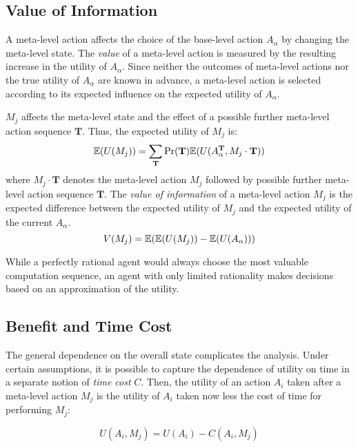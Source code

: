 \subsection{Value of Information}
\label{sec:ratimeta-voi}

A meta-level action affects the choice of the base-level action
$A_\alpha$ by changing the meta-level state.
The {\em value} of a meta-level action is measured by the
resulting increase in the utility of $A_\alpha$. Since neither the
outcomes of meta-level actions nor the true utility of $A_\alpha$ are
known in advance, a meta-level action is selected according to its
expected influence on the expected utility of $A_\alpha$.

$M_j$ affects the meta-level state and the effect of
a possible further meta-level action sequence $\mathbf{T}$. Thus, the expected utility of
$M_j$ is:
\begin{equation}
\label{eq:bg-limited-su}
\mathbb{E}(U(M_j))=\sum_{\mathbf{T}}\Pr(\mathbf{T})\mathbb{E}(U(A_{\alpha}^\mathbf{T},M_j\cdot\mathbf{T}))
\end{equation}
where $M_j\cdot\mathbf{T}$ denotes the meta-level action $M_j$
followed by possible further meta-level action sequence $\mathbf{T}$.
The {\em value of information} of a meta-level action $M_j$ is
the expected difference between the expected utility of $M_j$ and the
expected utility of the current $A_\alpha$.
\begin{equation}
\label{eq:bg-limited-nv}
V(M_j)=\mathbb{E}(\mathbb{E}(U(M_j))-\mathbb{E}(U(A_\alpha)))
\end{equation}

While a perfectly rational agent would always choose the most valuable
computation sequence, an agent with only limited rationality makes
decisions based on an approximation of the utility.

\subsection{Benefit and Time Cost}
\label{sec:ratimeta-benefit-timecost}

The general dependence on the overall state complicates the analysis. Under
certain assumptions, it is possible to capture the dependence of utility on time in a
separate notion of {\em time cost} $C$. Then, the utility of an action $A_i$ taken
 after a meta-level action $M_j$ is the utility of $A_i$ taken now less the
cost of time for performing $M_j$:

\begin{equation}
\label{eq:bg-limited-iu}
U(A_i, M_j) = U(A_i) - C(A_i, M_j)
\end{equation}


